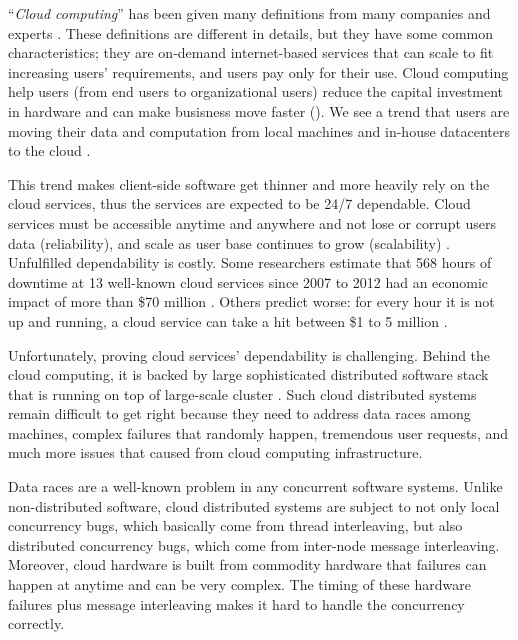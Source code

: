 ``\textit{Cloud computing}'' has been given many definitions from many companies
and experts \cite{TwentyoneCloudDef, IBMCloudDef, PCMagCloudDef,
Foster+08-CloudAndGrid}. These definitions are different in details, but they
have some common characteristics; they are on-demand internet-based services
that can scale to fit increasing users' requirements, and users pay only for
their use.
%
Cloud computing help users (from end users to organizational users) reduce the
capital investment in hardware and can make busisness move faster
\cite{Hayes+08-CloudComputing} (). We see a trend that users are moving their data and computation from
local machines and in-house datacenters to the cloud \cite{AdobeCloudStat,
AWSCustomer, GmailStat, GoogleDriveStat, DropboxStat, FacebookStat} .

This trend makes client-side software get thinner and more heavily rely on the
cloud services, thus the services are expected to be 24/7 dependable. Cloud
services must be accessible anytime and anywhere and not lose or corrupt users
data (reliability), and scale as user base continues to grow (scalability)
\cite{Buyya+09-Cloud5thUtil}.
%
Unfulfilled dependability is costly. Some researchers estimate that 568 hours of
downtime at 13 well-known cloud services since 2007 to 2012 had an economic
impact of more than \$70 million \cite{Essers12-70Million}. Others predict
worse: for every hour it is not up and running, a cloud service can take a hit
between \$1 to 5 million \cite{Linthicum13-InfoworldCostOutages}.

Unfortunately, proving cloud services' dependability is challenging. Behind the
cloud computing, it is backed by large sophisticated distributed software stack
\cite{Burrows06-Chubby, Chang+06-BigTable, Chapin+95-Hive, Corbett+12-Spanner,
DeanGhemawat04-MapReduce, DeCandia+07-Dynamo, Ghemawat+03-GoogleFS,
Hunt+10-ZooKeeperPaper, Lakshman+09-Cassandra, Melnik+10-DremelInteractive,
Zaharia+12-RDD} that is running on top of large-scale cluster .
Such cloud distributed systems remain difficult to get right because they need
to address data races among machines, complex failures that randomly happen,
tremendous user requests, and much more issues that caused from cloud computing
infrastructure.

Data races are a well-known problem in any concurrent software systems. Unlike
non-distributed software, cloud distributed systems are subject to not only
local concurrency bugs, which basically come from thread interleaving, but also
distributed concurrency bugs, which come from inter-node message interleaving. 
Moreover, cloud hardware is built from commodity hardware that failures can
happen at anytime and can be very complex. The timing of these hardware failures
plus message interleaving makes it hard to handle the concurrency correctly.

